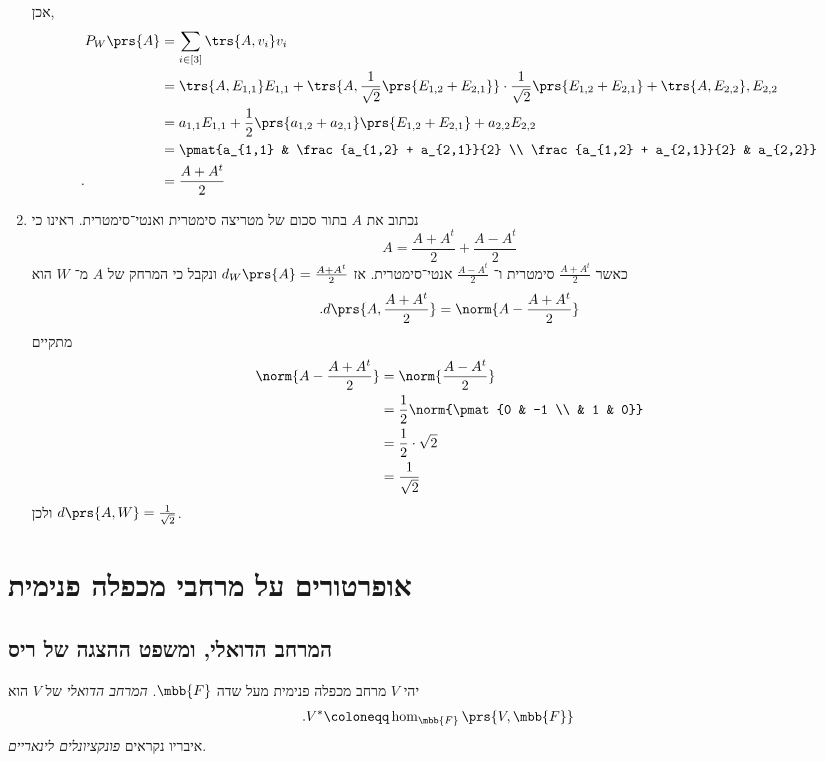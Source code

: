 \documentclass[a4paper,10pt,twoside,openany]{book}
\begin{document}
\begin{solution}
\begin{enumerate}
אכן,
\begin{align*}
P_W\prs{A} &= \sum_{i \in [3]} \trs{A, v_i} v_i \\&= \trs{A, E_{1,1}} E_{1,1} + \trs{A, \frac{1}{\sqrt{2}} \prs{E_{1,2} + E_{2,1}}} \cdot \frac{1}{\sqrt{2}} \prs{E_{1,2} + E_{2,1}} + \trs{A, E_{2,2}}, E_{2,2}
\\&=
a_{1,1} E_{1,1} + \frac{1}{2} \prs{a_{1,2} + a_{2,1}} \prs{E_{1,2} + E_{2,1}} + a_{2,2} E_{2,2}
\\&=
\pmat{a_{1,1} & \frac{a_{1,2} + a_{2,1}}{2} \\ \frac{a_{1,2} + a_{2,1}}{2} & a_{2,2}}
\\ \text{.} \hphantom{P_W\prs{A}} &=
\frac{A + A^t}{2}
\end{align*}

\item
נכתוב את
$A$
בתור סכום של מטריצה סימטרית ואנטי־סימטרית. ראינו כי
\[A = \frac{A + A^t}{2} + \frac{A - A^t}{2}\]
כאשר
$\frac{A + A^t}{2}$
סימטרית ו־%
$\frac{A - A^t}{2}$
אנטי־סימטרית.
אז
$d_W\prs{A} = \frac{A+A^t}{2}$
ונקבל כי
המרחק של
$A$
מ־%
$W$
הוא
\[\text{.} d\prs{A, \frac{A + A^t}{2}} = \norm{A - \frac{A + A^t}{2}}\]
מתקיים
\begin{align*}
\norm{A - \frac{A + A^t}{2}} &= \norm{\frac{A - A^t}{2}}
\\&= \frac{1}{2} \norm{\pmat{0 & -1 \\ & 1 & 0}}
\\&= \frac{1}{2} \cdot \sqrt{2}
\\&= \frac{1}{\sqrt{2}}
\end{align*}
ולכן
$d\prs{A, W} = \frac{1}{\sqrt{2}}$.
\end{enumerate}
\end{solution}

\chapter{אופרטורים על מרחבי מכפלה פנימית}

\section{המרחב הדואלי, ומשפט ההצגה של ריס}

\begin{definition}
יהי
$V$
מרחב מכפלה פנימית מעל שדה
$\mbb{F}$.
\emph{המרחב הדואלי}
של
$V$
הוא
\[\text{.} V^* \coloneqq \hom_{\mbb{F}}\prs{V,\mbb{F}}\]
איבריו נקראים
\emph{פונקציונלים לינאריים}.
\end{definition}
\end{document}
